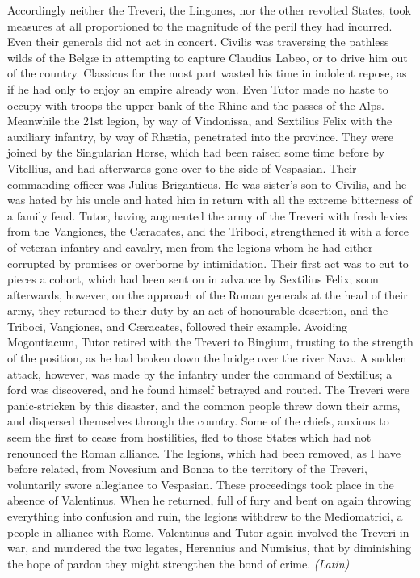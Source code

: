 Accordingly neither the Treveri, the Lingones, nor the other revolted States, took measures at all proportioned to the magnitude of the peril they had incurred. Even their generals did not act in concert. Civilis was traversing the pathless wilds of the Belgæ in attempting to capture Claudius Labeo, or to drive him out of the country. Classicus for the most part wasted his time in indolent repose, as if he had only to enjoy an empire already won. Even Tutor made no haste to occupy with troops the upper bank of the Rhine and the passes of the Alps. Meanwhile the 21st legion, by way of Vindonissa, and Sextilius Felix with the auxiliary infantry, by way of Rhætia, penetrated into the province. They were joined by the Singularian Horse, which had been raised some time before by Vitellius, and had afterwards gone over to the side of Vespasian. Their commanding officer was Julius Briganticus. He was sister's son to Civilis, and he was hated by his uncle and hated him in return with all the extreme bitterness of a family feud. Tutor, having augmented the army of the Treveri with fresh levies from the Vangiones, the Cæracates, and the Triboci, strengthened it with a force of veteran infantry and cavalry, men from the legions whom he had either corrupted by promises or overborne by intimidation. Their first act was to cut to pieces a cohort, which had been sent on in advance by Sextilius Felix; soon afterwards, however, on the approach of the Roman generals at the head of their army, they returned to their duty by an act of honourable desertion, and the Triboci, Vangiones, and Cæracates, followed their example. Avoiding Mogontiacum, Tutor retired with the Treveri to Bingium, trusting to the strength of the position, as he had broken down the bridge over the river Nava. A sudden attack, however, was made by the infantry under the command of Sextilius; a ford was discovered, and he found himself betrayed and routed. The Treveri were panic-stricken by this disaster, and the common people threw down their arms, and dispersed themselves through the country. Some of the chiefs, anxious to seem the first to cease from hostilities, fled to those States which had not renounced the Roman alliance. The legions, which had been removed, as I have before related, from Novesium and Bonna to the territory of the Treveri, voluntarily swore allegiance to Vespasian. These proceedings took place in the absence of Valentinus. When he returned, full of fury and bent on again throwing everything into confusion and ruin, the legions withdrew to the Mediomatrici, a people in alliance with Rome. Valentinus and Tutor again involved the Treveri in war, and murdered the two legates, Herennius and Numisius, that by diminishing the hope of pardon they might strengthen the bond of crime. \emph{(Latin)}

